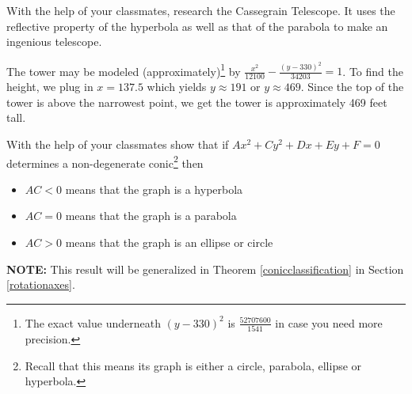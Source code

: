 \documentclass{ximera}
\begin{document}
\begin{problem}
    With the help of your classmates, research the Cassegrain Telescope.  It uses the reflective property of the hyperbola as well as that of the parabola to make an ingenious telescope.

\begin{solution}
The tower may be modeled (approximately)\footnote{The exact value underneath $(y - 330)^{2}$ is $\frac{52707600}{1541}$ in case you need more precision.} by $\frac{x^2}{12100} - \frac{(y-330)^2}{34203} = 1$.  To find the height, we plug in $x = 137.5$ which yields $y \approx 191$ or $y \approx 469$.  Since the top of the tower is above the narrowest point, we get the tower is approximately 469 feet tall.

\end{solution}
\end{problem}

\begin{problem} \label{conicsclassificationnoxytermex}
    
 With the help of your classmates show that if $Ax^2 + Cy^2 + Dx + Ey + F = 0$ determines a non-degenerate conic\footnote{Recall that this means its graph is either a circle, parabola, ellipse or hyperbola.} then

\begin{itemize}

\item  $AC < 0$ means that the graph is a hyperbola

\item  $AC = 0$ means that the graph is a parabola

\item  $AC > 0$ means that the graph is an ellipse or circle

\end{itemize}

\end{problem}


\textbf{NOTE:}  This result will be generalized in Theorem \ref{conicclassification} in Section \ref{rotationaxes}.
\end{document}
